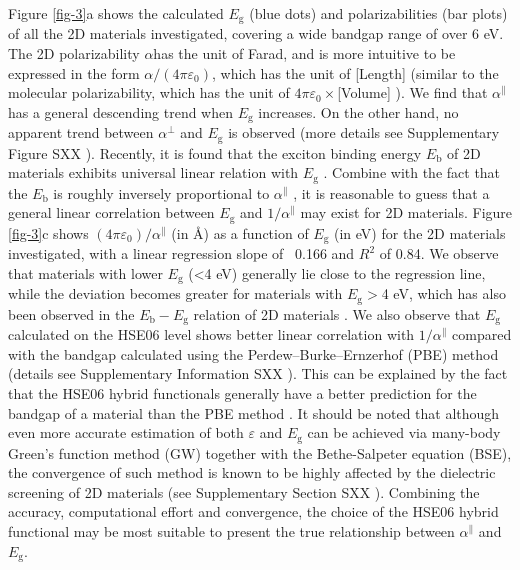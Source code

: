 \documentclass[journal=ancac3,manuscript=article,email=true,hyperref=true,keywords=false]{achemso}
\begin{document}
Figure \ref{fig-3}a shows the calculated $E_{\mathrm{g}}$ (blue dots)
and polarizabilities (bar plots) of all the 2D materials investigated,
covering a wide bandgap range of over 6 eV. The 2D polarizability
$\alpha $has the unit of Farad, and is more intuitive to be expressed
in the form $\alpha/(4 \pi \varepsilon_{0})$, which has the unit of
[Length] (similar to the molecular polarizability, which has the unit
of $4\pi \varepsilon_{0}\times$[Volume] \cite{Israelachvili_2011}). We
find that $\alpha^{\parallel}$ has a general descending trend when
$E_{\mathrm{g}}$ increases. On the other hand, no apparent trend
between $\alpha^{\perp}$ and $E_{\mathrm{g}}$ is observed (more
details see Supplementary Figure SXX ). Recently, it is
found that the exciton binding energy $E_{\mathrm{b}}$ of 2D materials
exhibits universal linear relation with $E_{\mathrm{g}}$
\cite{Choi_linear_2015,Olsen_2016_hydrogen,Jiang_2017_Eg_Eb}. Combine
with the fact that the $E_{\mathrm{b}}$ is roughly inversely
proportional to $\alpha^{\parallel}$ \cite{Pulci_2014}, it is
reasonable to guess that a general linear correlation between
$E_{\mathrm{g}}$ and $1/\alpha^{\parallel}$ may exist for 2D
materials. Figure \ref{fig-3}c shows
$(4 \pi \varepsilon_{0})/\alpha^{\parallel}$ (in \AA{}) as a function
of $E_{\mathrm{g}}$ (in eV) for the 2D materials investigated, with a
linear regression slope of ~0.166 and $R^{2}$ of 0.84. We observe that
materials with lower $E_{\mathrm{g}}$ (<4 eV) generally lie close to
the regression line, while the deviation becomes greater for materials
with $E_{\mathrm{g}}>$4 eV, which has also been observed in the
$E_{\mathrm{b}}-E_{\mathrm{g}}$ relation of 2D materials
\cite{Olsen_2016_hydrogen,Jiang_2017_Eg_Eb}. We also observe that
$E_{\mathrm{g}}$ calculated on the HSE06 level shows better linear
correlation with $1/\alpha^{\parallel}$ compared with the bandgap
calculated using the Perdew–Burke–Ernzerhof (PBE) method (details see
Supplementary Information SXX ). This can be explained by
the fact that the HSE06 hybrid functionals generally have a better
prediction for the bandgap of a material than the PBE method
. It should be noted that although even more
accurate estimation of both $\varepsilon$ and $E_{\mathrm{g}}$ can be
achieved via many-body Green’s function method (GW) together with the
Bethe-Salpeter equation (BSE), the convergence of such method is known
to be highly affected by the dielectric screening of 2D materials
\cite{Hueser_2013_2Dvs3D} (see Supplementary Section SXX
\todo{}). Combining the accuracy, computational effort and
convergence, the choice of the HSE06 hybrid functional may be most
suitable to present the true relationship between $\alpha^{\parallel}$
and $E_{\mathrm{g}}$.
\end{document}
